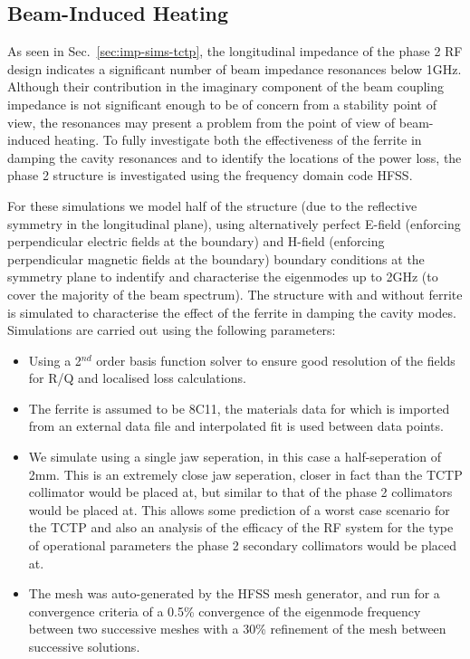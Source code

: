 \subsection{Beam-Induced Heating}
\label{sec:beam-heating-tctp}

As seen in Sec.~\ref{sec:imp-sims-tctp}, the longitudinal impedance of the phase 2 RF design indicates a significant number of beam impedance resonances below 1GHz. Although their contribution in the imaginary component of the beam coupling impedance is not significant enough to be of concern from a stability point of view, the resonances may present a problem from the point of view of beam-induced heating. To fully investigate both the effectiveness of the ferrite in damping the cavity resonances and to identify the locations of the power loss, the phase 2 structure is investigated using the frequency domain code HFSS. 

For these simulations we model half of the structure (due to the reflective symmetry in the longitudinal plane), using alternatively perfect E-field (enforcing perpendicular electric fields at the boundary) and H-field (enforcing perpendicular magnetic fields at the boundary) boundary conditions at the symmetry plane to indentify and characterise the eigenmodes up to 2GHz (to cover the majority of the beam spectrum). The structure with and without ferrite is simulated to characterise the effect of the ferrite in damping the cavity modes. Simulations are carried out using the following parameters:

\begin{itemize}
\item{Using a 2$^{nd}$ order basis function solver to ensure good resolution of the fields for R/Q and localised loss calculations.}
\item{The ferrite is assumed to be 8C11, the materials data for which is imported from an external data file and interpolated fit is used between data points.}
\item{We simulate using a single jaw seperation, in this case a half-seperation of 2mm. This is an extremely close jaw seperation, closer in fact than the TCTP collimator would be placed at, but similar to that of the phase 2 collimators would be placed at. This allows some prediction of a worst case scenario for the TCTP and also an analysis of the efficacy of the RF system for the type of operational parameters the phase 2 secondary collimators would be placed at.}
\item{The mesh was auto-generated by the HFSS mesh generator, and run for a convergence criteria of a 0.5\% convergence of the eigenmode frequency between two successive meshes with a 30\% refinement of the mesh between successive solutions.}
\end{itemize}

